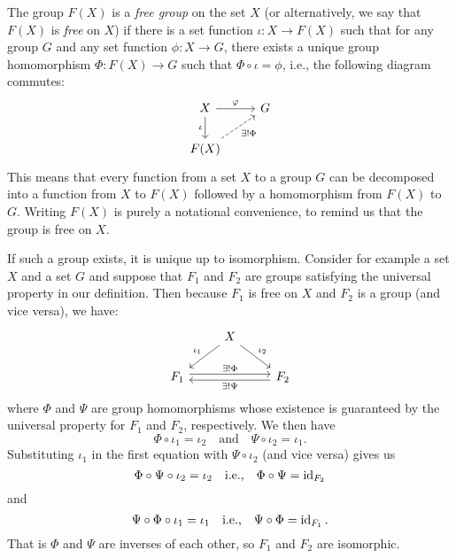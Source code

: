 \begin{definition}
    The group \(F(X)\) is a \emph{free group} on the set \(X\) (or
    alternatively, we say that \(F(X)\) is \emph{free} on \(X\)) if there is a
    set function \(\iota: X \to F(X)\) such that for any group \(G\) and any set
    function \(\phi: X \to G\), there exists a unique group homomorphism \(\Phi:
    F(X) \to G\) such that \(\Phi \circ \iota = \phi\), i.e., the following
    diagram commutes:
    \[
        \begin{tikzcd}
            X \arrow[d, "\iota"'] \arrow[r, "\phi"] & G \\
            F(X) \arrow[ru, "\exists!\Phi"', dashed]        &  
        \end{tikzcd}
    \]
    This means that every function from a set \(X\) to a group \(G\) can be
    decomposed into a function from \(X\) to \(F(X)\) followed by a homomorphism
    from \(F(X)\) to \(G\). Writing \(F(X)\) is purely a notational convenience,
    to remind us that the group is free on \(X\).

    If such a group exists, it is unique up to isomorphism. Consider for example
    a set \(X\) and a set \(G\) and suppose that \(F_1\) and \(F_2\) are groups
    satisfying the universal property in our definition. Then because \(F_1\) is
    free on \(X\) and \(F_2\) is a group (and vice versa), we have:
    \[
        \begin{tikzcd}
            & X \arrow[dl, "\iota_1"'] \arrow[dr, "\iota_2"] & \\
            F_1 \arrow[rr, "\exists!\Phi", shift left] & & F_2 \arrow[ll, "\exists!\Psi", shift left]
        \end{tikzcd}
    \]
    where \(\Phi\) and \(\Psi\) are group homomorphisms whose existence is
    guaranteed by the universal property for \(F_1\) and \(F_2\), respectively.
    We then have
    \[
        \Phi \circ \iota_1 = \iota_2 \quad \text{and} \quad \Psi \circ \iota_2 = \iota_1.
    \]
    Substituting \(\iota_1\) in the first equation with \(\Psi \circ \iota_2\)
    (and vice versa) gives us
    \[
        \Phi \circ \Psi \circ \iota_2 = \iota_2 \quad \text{i.e.,} \quad \Phi \circ \Psi = \operatorname{id}_{F_2}
    \]
    and
    \[
        \Psi \circ \Phi \circ \iota_1 = \iota_1 \quad \text{i.e.,} \quad \Psi \circ \Phi = \operatorname{id}_{F_1}.
    \]
    That is \(\Phi\) and \(\Psi\) are inverses of each other, so \(F_1\) and
    \(F_2\) are isomorphic.
\end{definition}

